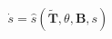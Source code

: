 \documentclass[preview]{standalone}
\begin{document}
\begin{align*}
\dot{s} = \hat{s}(\tilde{\mathbf{T}}, \theta, \mathbf{B}, s)
\end{align*}
\end{document}
